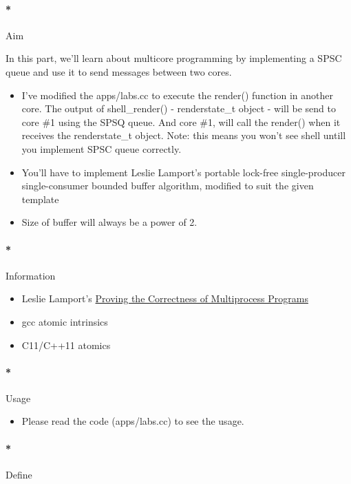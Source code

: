 \documentclass[]{article}
\providecommand{\tightlist}{%
  \setlength{\itemsep}{0pt}\setlength{\parskip}{0pt}}
\let\oldparagraph\paragraph
\renewcommand{\paragraph}[1]{\oldparagraph{#1}\mbox{}}
\begin{document}
\paragraph*{Aim}\label{aim-8}

In this part, we'll learn about multicore programming by implementing a
SPSC queue and use it to send messages between two cores.

\begin{itemize}
\tightlist
\item
  I've modified the apps/labs.cc to execute the render() function in
  another core. The output of shell\_render() - renderstate\_t object -
  will be send to core \#1 using the SPSQ queue. And core \#1, will call
  the render() when it receives the renderstate\_t object. Note: this
  means you won't see shell untill you implement SPSC queue correctly.
\item
  You'll have to implement Leslie Lamport's portable lock-free
  single-producer single-consumer bounded buffer algorithm, modified to
  suit the given template
\item
  Size of buffer will always be a power of 2.
\end{itemize}

\paragraph*{Information}\label{information-8}

\begin{itemize}
\tightlist
\item
  Leslie Lamport's \href{proving.pdf}{Proving the Correctness of
  Multiprocess Programs}
\item
  gcc atomic intrinsics
\item
  C11/C++11 atomics
\end{itemize}

\paragraph*{Usage}\label{usage-8}

\begin{itemize}
\tightlist
\item
  Please read the code (apps/labs.cc) to see the usage.
\end{itemize}

\paragraph*{Define}\label{define-8}
\end{document}
